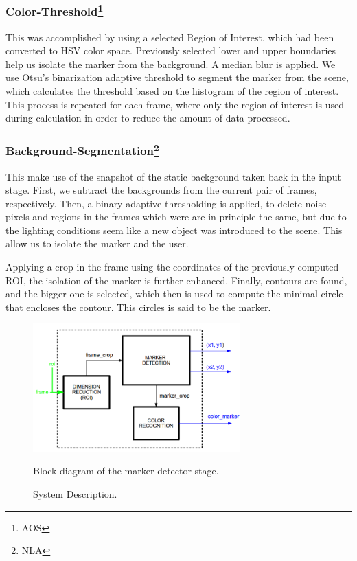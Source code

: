\documentclass[a4paper,12pt]{article}
\begin{document}
\subsubsection[Color-Threshold]{Color-Threshold\footnote{AOS}}
This was accomplished by using a selected Region of Interest, which had been converted to HSV color space. Previously selected lower and upper boundaries help us isolate the marker from the background. A median blur is applied. We use Otsu's binarization adaptive threshold to segment the marker from the scene, which calculates the threshold based on the histogram of the region of interest. This process is repeated for each frame, where only the region of interest is used during calculation in order to reduce the amount of data processed.

\subsubsection[Background-Segmentation.]{Background-Segmentation\footnote{NLA}}
This make use of the snapshot of the static background taken back in the input stage. First, we subtract the backgrounds from the current pair of frames, respectively. Then, a binary adaptive thresholding is applied, to delete noise pixels and regions in the frames which were are in principle the same, but due to the lighting conditions seem like a new object was introduced to the scene. This allow us to isolate the marker and the user. 

Applying a crop in the frame using the coordinates of the previously computed ROI, the isolation of the marker is further enhanced. Finally, contours are found, and the bigger one is selected, which then is used to compute the minimal circle that encloses the contour. This circles is said to be the marker.


\begin{figure}[H]
    \begin{center}
	\includegraphics[width=8cm]{marker-stage.png}
	\caption{System Description.}
    Block-diagram of the marker detector stage.
	\label{fig:mark}
    \end{center}
\end{figure}
\end{document}
